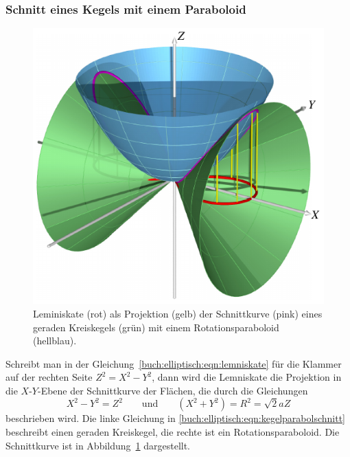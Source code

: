 %
%
\subsubsection{Schnitt eines Kegels mit einem Paraboloid}
\begin{figure}
\center
\includegraphics{chapters/110-elliptisch/images/kegelpara.pdf}
\caption{Leminiskate (rot) als Projektion (gelb) der Schnittkurve (pink)
eines geraden
Kreiskegels (grün) mit einem Rotationsparaboloid (hellblau).
\label{buch:elliptisch:lemniskate:kegelpara}}
\end{figure}%
%
%
Schreibt man in der Gleichung~\eqref{buch:elliptisch:eqn:lemniskate}
für die Klammer auf der rechten Seite $Z^2 = X^2 - Y^2$, dann wird die
Lemniskate die Projektion in die $X$-$Y$-Ebene der Schnittkurve der Flächen,
die durch die Gleichungen
\begin{equation}
X^2-Y^2 = Z^2
\qquad\text{und}\qquad
(X^2+Y^2) = R^2 = \!\sqrt{2}aZ
\label{buch:elliptisch:eqn:kegelparabolschnitt}
\end{equation}
beschrieben wird.
Die linke Gleichung in 
\eqref{buch:elliptisch:eqn:kegelparabolschnitt}
beschreibt einen geraden Kreiskegel, die rechte ist ein Rotationsparaboloid.
Die Schnittkurve ist in Abbildung~\ref{buch:elliptisch:lemniskate:kegelpara}
dargestellt.

